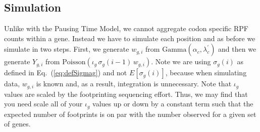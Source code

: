 \documentclass{article}
\newcommand{\elongWaitTime}{\ensuremath{w}\xspace}
\newcommand{\wgi}{\ensuremath{\elongWaitTime_{g,i}}\xspace}
\newcommand{\WaitTerm}{\ensuremath{w}\xspace} %
\newcommand{\Wgi}{\ensuremath{\WaitTerm_{g,i}}\xspace}
\newcommand{\alphac}{\ensuremath{{\alpha_c}}\xspace}
\newcommand{\lambdacprime}{\ensuremath{{\lambda_c^\prime}}\xspace}
\newcommand{\sigmag}{\ensuremath{\sigma_{g}}\xspace}
\newcommand{\sigmagi}{\ensuremath{\sigma_{g}(i)}\xspace}
\newcommand{\Esigmagi}{\ensuremath{E\left[\sigma_{g}(i)\right]}\xspace}
\newcommand{\iotag}{\ensuremath{{\iota_g}}\xspace}
\newcommand{\Ygi}{\ensuremath{{Y_{g,i}}}\xspace}
\begin{document}
\subsection*{Simulation}
Unlike with the Pausing Time Model, we cannot aggregate codon specific RPF counts within a gene.
Instead we have to simulate each position and as before we simulate in two steps.
First, we generate $\Wgi$  from $\text{Gamma}(\alphac, \lambdacprime)$ and then we generate $\Ygi$ from $\text{Poisson}\left(\iotag \, \sigmag(i-1)\, \Wgi\right)$.
Note we are using $\sigmagi$ as defined in Eq.~(\ref{eq:defSigmag}) and not $\Esigmagi$, because when simulating data, $\wgi$ is known and, as a result, integration is unnecessary.
Note that $\iotag$ values are scaled by the footprinting sequencing effort.
Thus, we may find that you need scale all of your $\iotag$ values up or down by a constant term such that the expected number of footprints is on par with the number observed for a given set of genes.
\end{document}
